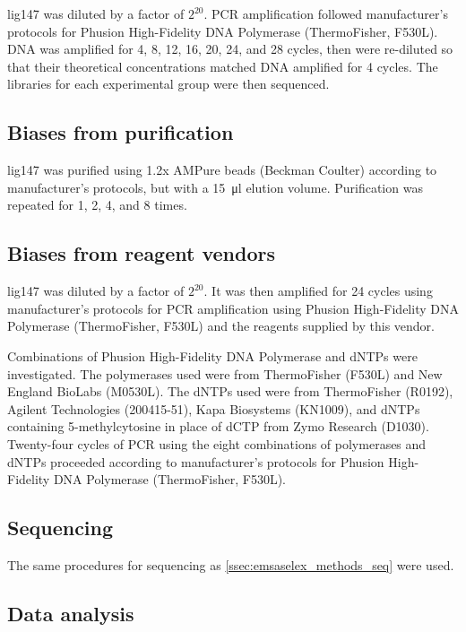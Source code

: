 \documentclass[parskip=full, numbers=noenddot]{scrbook}
\begin{document}
lig147 was diluted by a factor of $2^{20}$.  PCR amplification followed manufacturer's protocols for Phusion High-Fidelity DNA Polymerase (ThermoFisher, F530L).  DNA was amplified for 4, 8, 12, 16, 20, 24, and 28 cycles, then were re-diluted so that their theoretical concentrations matched DNA amplified for 4 cycles.  The libraries for each experimental group were then sequenced.

\subsection{Biases from purification}
\label{ssec:pcrbias_methods_pur}

lig147 was purified using 1.2x AMPure beads (Beckman Coulter) according to manufacturer's protocols, but with a \SI{15}{\micro\litre} elution volume.  Purification was repeated for 1, 2, 4, and 8 times.

\subsection{Biases from reagent vendors}
\label{ssec:pcrbias_methods_reagent}

lig147 was diluted by a factor of $2^{20}$.  It was then amplified for 24 cycles using manufacturer's protocols for PCR amplification using Phusion High-Fidelity DNA Polymerase (ThermoFisher, F530L) and the reagents supplied by this vendor.

Combinations of Phusion High-Fidelity DNA Polymerase and dNTPs were investigated.  The polymerases used were from ThermoFisher (F530L) and New England BioLabs (M0530L).  The dNTPs used were from ThermoFisher (R0192), Agilent Technologies (200415-51), Kapa Biosystems (KN1009), and dNTPs containing 5-methylcytosine in place of dCTP from Zymo Research (D1030).  Twenty-four cycles of PCR using the eight combinations of polymerases and dNTPs proceeded according to manufacturer's protocols for Phusion High-Fidelity DNA Polymerase (ThermoFisher, F530L).

\subsection{Sequencing}
\label{ssec:pcrbias_methods_seq}

The same procedures for sequencing as \ref{ssec:emsaselex_methods_seq} were used.

\subsection{Data analysis}
\label{ssec:pcrbias_methods_anal}
\end{document}
